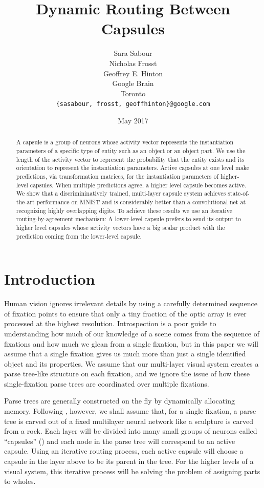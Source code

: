 \documentclass{article}
\title{Dynamic Routing Between Capsules}
\author{
  Sara Sabour \\
  \And
  Nicholas Frosst \\
  \AND
  Geoffrey E. Hinton \\
  Google Brain\\
  Toronto \\
  \texttt{\{sasabour, frosst, geoffhinton\}@google.com} \\
}
\date{May 2017}
\begin{document}
\maketitle

\begin{abstract}
A capsule is a group of neurons whose activity vector represents the instantiation parameters of a specific type of entity such as an object or an object part. We use the length of the activity vector to represent the probability that the entity exists and its orientation to represent the instantiation parameters. Active capsules at one level make predictions, via transformation matrices, for the instantiation parameters of higher-level capsules.  When multiple predictions agree, a higher level capsule becomes active. We show that a discrimininatively trained, multi-layer capsule system achieves state-of-the-art performance on MNIST and is considerably better than a convolutional net at recognizing highly overlapping digits. To achieve these results we use an iterative routing-by-agreement mechanism: A lower-level capsule prefers to send its output to higher level capsules whose activity vectors have a big scalar product with the prediction coming from the lower-level capsule. 
\end{abstract}
\section{Introduction}

Human vision ignores irrelevant details by using a carefully determined sequence of fixation points to ensure that only a tiny fraction of the optic array is ever processed at the highest resolution.  Introspection is a poor guide to understanding how much of our knowledge of a scene comes from the sequence of fixations and how much we glean from a single fixation, but in this paper we will assume that a single fixation gives us much more than just a single identified object and its properties. We assume that our multi-layer visual system creates a parse tree-like structure on each fixation, and we ignore the issue of how these single-fixation parse trees are coordinated over multiple fixations. 

Parse trees are generally constructed on the fly by dynamically allocating memory. Following \cite{hinton2000learning}, however, we shall assume that, for a single fixation, a parse tree is carved out of a fixed multilayer neural network like a sculpture is carved from a rock.   Each layer will be divided into many small groups of neurons called ``capsules'' (\cite{hinton2011transforming}) and each node in the parse tree will correspond to an active capsule. Using an iterative routing process,  each active capsule will choose a capsule in the layer above to be its parent in the tree. For the higher levels of a visual system, this iterative process will be solving the problem of assigning parts to wholes. 
\end{document}
